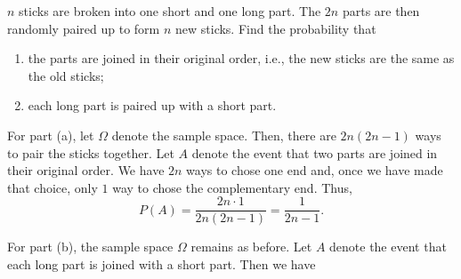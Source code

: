 \begin{problem}[Handout 3, \# 3]
  \(n\) sticks are broken into one short and one long part. The \(2n\)
  parts are then randomly paired up to form \(n\) new sticks. Find the
  probability that
  \begin{enumerate}[label=(\alph*),noitemsep]
  \item the parts are joined in their original order, i.e., the new sticks
    are the same as the old sticks;
  \item each long part is paired up with a short part.
  \end{enumerate}
\end{problem}
\begin{solution}
  For part (a), let \(\Omega\) denote the sample space. Then, there are
  \(2n(2n-1)\) ways to pair the sticks together. Let \(A\) denote the event
  that two parts are joined in their original order. We have \(2n\) ways to
  chose one end and, once we have made that choice, only \(1\) way to chose
  the complementary end. Thus,
  \[
    P(A)=\frac{2n\cdot 1}{2n(2n-1)}=\frac{1}{2n-1}.
  \]

  For part (b), the sample space \(\Omega\) remains as before. Let \(A\)
  denote the event that each long part is joined with a short part. Then we
  have
\end{solution}
\newpage

